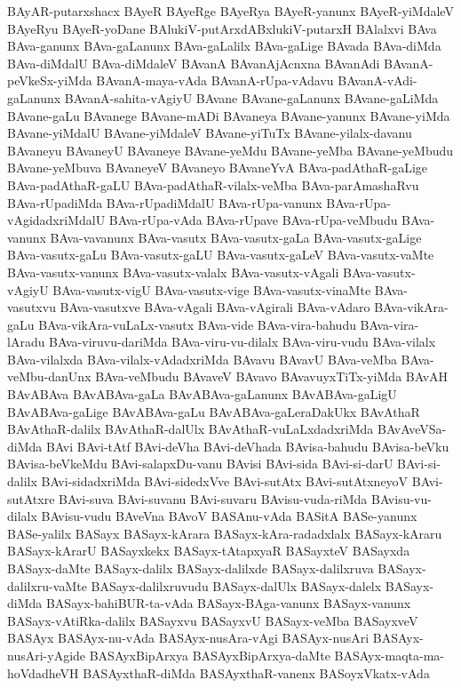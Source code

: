 {BAyAR-putarxshacx
BAyeR
BAyeRge
BAyeRya
BAyeR-yanunx
BAyeR-yiMdaleV
BAyeRyu
BAyeR-yoDane
BAlukiV-putArxdABxlukiV-putarxH
BAlalxvi
BAva
BAva-ganunx
BAva-gaLanunx
BAva-gaLalilx
BAva-gaLige
BAvada
BAva-diMda
BAva-diMdalU
BAva-diMdaleV
BAvanA
BAvanAjAcnxna
BAvanAdi
BAvanA-peVkeSx-yiMda
BAvanA-maya-vAda
BAvanA-rUpa-vAdavu
BAvanA-vAdi-gaLanunx
BAvanA-sahita-vAgiyU
BAvane
BAvane-gaLanunx
BAvane-gaLiMda
BAvane-gaLu
BAvanege
BAvane-mADi
BAvaneya
BAvane-yanunx
BAvane-yiMda
BAvane-yiMdalU
BAvane-yiMdaleV
BAvane-yiTuTx
BAvane-yilalx-davanu
BAvaneyu
BAvaneyU
BAvaneye
BAvane-yeMdu
BAvane-yeMba
BAvane-yeMbudu
BAvane-yeMbuva
BAvaneyeV
BAvaneyo
BAvaneYvA
BAva-padAthaR-gaLige
BAva-padAthaR-gaLU
BAva-padAthaR-vilalx-veMba
BAva-parAmashaRvu
BAva-rUpadiMda
BAva-rUpadiMdalU
BAva-rUpa-vanunx
BAva-rUpa-vAgidadxriMdalU
BAva-rUpa-vAda
BAva-rUpave
BAva-rUpa-veMbudu
BAva-vanunx
BAva-vavanunx
BAva-vasutx
BAva-vasutx-gaLa
BAva-vasutx-gaLige
BAva-vasutx-gaLu
BAva-vasutx-gaLU
BAva-vasutx-gaLeV
BAva-vasutx-vaMte
BAva-vasutx-vanunx
BAva-vasutx-valalx
BAva-vasutx-vAgali
BAva-vasutx-vAgiyU
BAva-vasutx-vigU
BAva-vasutx-vige
BAva-vasutx-vinaMte
BAva-vasutxvu
BAva-vasutxve
BAva-vAgali
BAva-vAgirali
BAva-vAdaro
BAva-vikAra-gaLu
BAva-vikAra-vuLaLx-vasutx
BAva-vide
BAva-vira-bahudu
BAva-vira-lAradu
BAva-viruvu-dariMda
BAva-viru-vu-dilalx
BAva-viru-vudu
BAva-vilalx
BAva-vilalxda
BAva-vilalx-vAdadxriMda
BAvavu
BAvavU
BAva-veMba
BAva-veMbu-danUnx
BAva-veMbudu
BAvaveV
BAvavo
BAvavuyxTiTx-yiMda
BAvAH
BAvABAva
BAvABAva-gaLa
BAvABAva-gaLanunx
BAvABAva-gaLigU
BAvABAva-gaLige
BAvABAva-gaLu
BAvABAva-gaLeraDakUkx
BAvAthaR
BAvAthaR-dalilx
BAvAthaR-dalUlx
BAvAthaR-vuLaLxdadxriMda
BAvAveVSa-diMda
BAvi
BAvi-tAtf
BAvi-deVha
BAvi-deVhada
BAvisa-bahudu
BAvisa-beVku
BAvisa-beVkeMdu
BAvi-salapxDu-vanu
BAvisi
BAvi-sida
BAvi-si-darU
BAvi-si-dalilx
BAvi-sidadxriMda
BAvi-sidedxVve
BAvi-sutAtx
BAvi-sutAtxneyoV
BAvi-sutAtxre
BAvi-suva
BAvi-suvanu
BAvi-suvaru
BAvisu-vuda-riMda
BAvisu-vu-dilalx
BAvisu-vudu
BAveVna
BAvoV
BASAnu-vAda
BASitA
BASe-yanunx
BASe-yalilx
BASayx
BASayx-kArara
BASayx-kAra-radadxlalx
BASayx-kAraru
BASayx-kArarU
BASayxkekx
BASayx-tAtapxyaR
BASayxteV
BASayxda
BASayx-daMte
BASayx-dalilx
BASayx-dalilxde
BASayx-dalilxruva
BASayx-dalilxru-vaMte
BASayx-dalilxruvudu
BASayx-dalUlx
BASayx-dalelx
BASayx-diMda
BASayx-bahiBUR-ta-vAda
BASayx-BAga-vanunx
BASayx-vanunx
BASayx-vAtiRka-dalilx
BASayxvu
BASayxvU
BASayx-veMba
BASayxveV
BASAyx
BASAyx-nu-vAda
BASAyx-nusAra-vAgi
BASAyx-nusAri
BASAyx-nusAri-yAgide
BASAyxBipArxya
BASAyxBipArxya-daMte
BASAyx-maqta-ma-hoVdadheVH
BASAyxthaR-diMda
BASAyxthaR-vanenx
BASoyxVkatx-vAda
}
